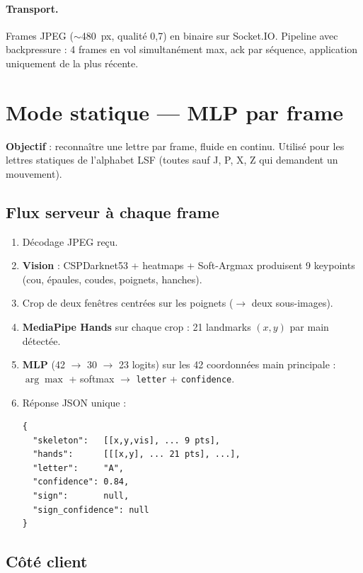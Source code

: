 \documentclass[11pt,a4paper]{article}
\begin{document}
\paragraph{Transport.} Frames JPEG ($\sim$480~px, qualit\'e 0{,}7) en binaire
sur Socket.IO. Pipeline avec backpressure : 4 frames en vol simultan\'ement
max, ack par s\'equence, application uniquement de la plus r\'ecente.

\section{Mode statique --- MLP par frame}

\textbf{Objectif} : reconna\^itre une lettre par frame, fluide en continu.
Utilis\'e pour les lettres statiques de l'alphabet LSF (toutes sauf J, P, X,
Z qui demandent un mouvement).

\subsection*{Flux serveur \`a chaque frame}

\begin{enumerate}[leftmargin=*, itemsep=2pt]
  \item D\'ecodage JPEG re\c{c}u.
  \item \textbf{Vision} : CSPDarknet53 + heatmaps + Soft-Argmax produisent
        9 keypoints (cou, \'epaules, coudes, poignets, hanches).
  \item Crop de deux fen\^etres centr\'ees sur les poignets ($\to$ deux
        sous-images).
  \item \textbf{MediaPipe Hands} sur chaque crop : 21 landmarks $(x, y)$
        par main d\'etect\'ee.
  \item \textbf{MLP} (42 $\to$ 30 $\to$ 23 logits) sur les 42 coordonn\'ees
        \og main principale \fg{} : $\arg\max$ + softmax $\to$ \texttt{letter}
        + \texttt{confidence}.
  \item R\'eponse JSON unique :
\begin{lstlisting}
{
  "skeleton":   [[x,y,vis], ... 9 pts],
  "hands":      [[[x,y], ... 21 pts], ...],
  "letter":     "A",
  "confidence": 0.84,
  "sign":       null,
  "sign_confidence": null
}
\end{lstlisting}
\end{enumerate}

\subsection*{C\^ot\'e client}
\end{document}
